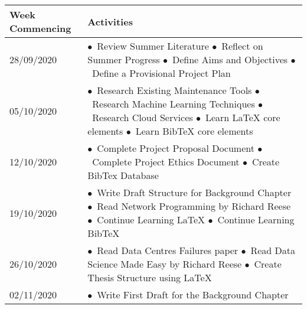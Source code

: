 \noindent
\begin{longtable}{
|p{}%
|p{}|%
}
    \hline
    \centering \textbf{Week Commencing}        & \arraybackslash \textbf{Activities}     \\ \hline
    28/09/2020                 &
    \indent$\bullet$\ Review Summer Literature \newline
    \indent$\bullet$\ Reflect on Summer Progress \newline
    \indent$\bullet$\ Define Aims and Objectives \newline
    \indent$\bullet$\ Define a Provisional Project Plan
    \\ \hline
    05/10/2020                 &
    \indent$\bullet$\ Research Existing Maintenance Tools \newline
    \indent$\bullet$\ Research Machine Learning Techniques \newline
    \indent$\bullet$\ Research Cloud Services \newline
    \indent$\bullet$\ Learn LaTeX core elements \newline
    \indent$\bullet$\ Learn BibTeX core elements
    \\ \hline
    12/10/2020                 &
    \indent$\bullet$\ Complete Project Proposal Document \newline
    \indent$\bullet$\ Complete Project Ethics Document \newline
    \indent$\bullet$\ Create BibTex Database
    \\ \hline
    19/10/2020                 &
    \indent$\bullet$\ Write Draft Structure for Background Chapter \newline
    \indent$\bullet$\ Read Network Programming by Richard Reese \newline
    \indent$\bullet$\ Continue Learning LaTeX \newline
    \indent$\bullet$\ Continue Learning BibTeX
    \\ \hline
    26/10/2020                 &
    \indent$\bullet$\ Read Data Centres Failures paper \newline
    \indent$\bullet$\ Read Data Science Made Easy by Richard Reese \newline
    \indent$\bullet$\ Create Thesis Structure using LaTeX
    \\ \hline
    02/11/2020                 &
    \indent$\bullet$\ Write First Draft for the Background Chapter \newline

\end{longtable}
